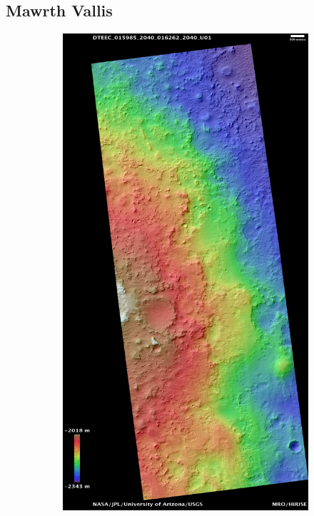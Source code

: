 \documentclass[12pt]{article}
\newcommand{\supcite}[1]{\textsuperscript{\cite{#1}}}
\begin{document}
\subsection{Mawrth Vallis\supcite{bib:ESP_015985_2040}}
\label{sub:mawrth_vallis}
\begin{figure}[h!]
  \centering
  \begin{subfigure}[t]{0.35\textwidth}
    \centering
    \includegraphics[height=0.4\paperheight]{figures/maps/ESP_015985_2040/DTEEC_015985_2040_016262_2040_U01.jpg}

\end{subfigure}
\end{figure}
\end{document}
